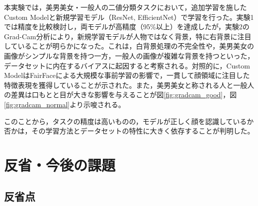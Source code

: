 \documentclass[a4paper,11pt,titlepage]{jsarticle}
\begin{document}
本実験では，美男美女・一般人の二値分類タスクにおいて，追加学習を施したCustom Modelと新規学習モデル（ResNet, EfficientNet）で学習を行った。実験1では精度を比較検討し，両モデルが高精度（95\%以上）を達成したが，実験2のGrad-Cam分析により，新規学習モデルが人物ではなく背景，特に右背景に注目していることが明らかになった。これは，白背景処理の不完全性や，美男美女の画像がシンプルな背景を持つ一方，一般人の画像が複雑な背景を持つといった，データセットに内在するバイアスに起因すると考察される。対照的に，Custom ModelはFairFaceによる大規模な事前学習の影響で，一貫して顔領域に注目した特徴表現を獲得していることが示された。また，美男美女と称される人と一般人の差異は口もとと目が大きな影響を与えることが図\ref{fig:gradcam_good}，図\ref{fig:gradcam_normal}より示唆される。\par

このことから，タスクの精度は高いものの，モデルが正しく顔を認識しているか否かは，その学習方法とデータセットの特性に大きく依存することが判明した。



\section{反省・今後の課題}

\subsection{反省点}
\end{document}
